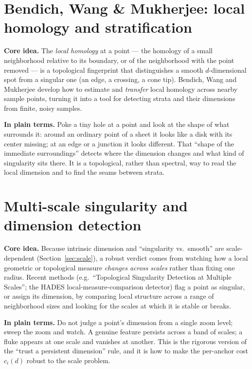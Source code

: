 \documentclass[11pt]{article}
\theoremstyle{definition}
\theoremstyle{remark}
\begin{document}
\section{Bendich, Wang \& Mukherjee: local homology and stratification}
\label{app:localhomology}
\textbf{Core idea.} The \emph{local homology} at a point --- the homology of a
small neighborhood relative to its boundary, or of the neighborhood with the point
removed --- is a topological fingerprint that distinguishes a smooth
$d$-dimensional spot from a singular one (an edge, a crossing, a cone tip). Bendich,
Wang and Mukherjee develop how to estimate and \emph{transfer} local homology
across nearby sample points, turning it into a tool for detecting strata and their
dimensions from finite, noisy samples.

\textbf{In plain terms.} Poke a tiny hole at a point and look at the shape of what
surrounds it: around an ordinary point of a sheet it looks like a disk with its
center missing; at an edge or a junction it looks different. That ``shape of the
immediate surroundings'' detects where the dimension changes and what kind of
singularity sits there. It is a topological, rather than spectral, way to read the
local dimension and to find the seams between strata.

\section{Multi-scale singularity and dimension detection}
\label{app:multiscale}
\textbf{Core idea.} Because intrinsic dimension and ``singularity vs.\ smooth''
are scale-dependent (Section~\ref{sec:scale}), a robust verdict comes from watching
how a local geometric or topological measure \emph{changes across scales} rather
than fixing one radius. Recent methods (e.g.\ ``Topological Singularity Detection
at Multiple Scales''; the HADES local-measure-comparison detector) flag a point as
singular, or assign its dimension, by comparing local structure across a range of
neighborhood sizes and looking for the scales at which it is stable or breaks.

\textbf{In plain terms.} Do not judge a point's dimension from a single zoom level;
sweep the zoom and watch. A genuine feature persists across a band of scales; a
fluke appears at one scale and vanishes at another. This is the rigorous version of
the ``trust a persistent dimension'' rule, and it is how to make the per-anchor cost
$c_i(d)$ robust to the scale problem.
\end{document}
